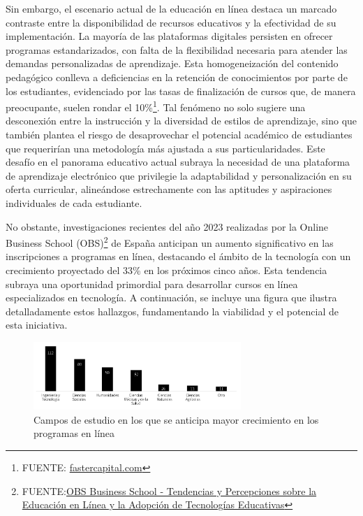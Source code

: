 \documentclass[
]{article}
\begin{document}
Sin embargo, el escenario actual de la educación en línea destaca un
marcado contraste entre la disponibilidad de recursos educativos y la
efectividad de su implementación. La mayoría de las plataformas
digitales persisten en ofrecer programas estandarizados, con falta de la
flexibilidad necesaria para atender las demandas personalizadas de
aprendizaje. Esta homogeneización del contenido pedagógico conlleva a
deficiencias en la retención de conocimientos por parte de los
estudiantes, evidenciado por las tasas de finalización de cursos que, de
manera preocupante, suelen rondar el 10\%\footnote{FUENTE:
  \href{https://fastercapital.com/es/contenido/Tasas-de-retencion-de-cursos--Tasas-de-retencion-de-cursos--una-metrica-clave-para-el-exito-del-marketing.html}{fastercapital.com}}.
Tal fenómeno no solo sugiere una desconexión entre la instrucción y la
diversidad de estilos de aprendizaje, sino que también plantea el riesgo
de desaprovechar el potencial académico de estudiantes que requerirían
una metodología más ajustada a sus particularidades. Este desafío en el
panorama educativo actual subraya la necesidad de una plataforma de
aprendizaje electrónico que privilegie la adaptabilidad y
personalización en su oferta curricular, alineándose estrechamente con
las aptitudes y aspiraciones individuales de cada estudiante.

No obstante, investigaciones recientes del año 2023 realizadas por la
Online Business School (OBS)\footnote{FUENTE:\href{https://www.obsbusiness.school/sites/obsbusiness.school/files/media_files/Informe\%20OBS\%20E-Learning\%202023.pdf}{OBS
  Business School - Tendencias y Percepciones sobre la Educación en
  Línea y la Adopción de Tecnologías Educativas}} de España anticipan un
aumento significativo en las inscripciones a programas en línea,
destacando el ámbito de la tecnología con un crecimiento proyectado del
33\% en los próximos cinco años. Esta tendencia subraya una oportunidad
primordial para desarrollar cursos en línea especializados en
tecnología. A continuación, se incluye una figura que ilustra
detalladamente estos hallazgos, fundamentando la viabilidad y el
potencial de esta iniciativa.

\begin{figure}
\centering
\includegraphics[width=0.7\textwidth,height=\textheight]{img/ingenieria_tecnologia.png}
\caption{Campos de estudio en los que se anticipa mayor crecimiento en
los programas en línea}
\end{figure}
\end{document}
